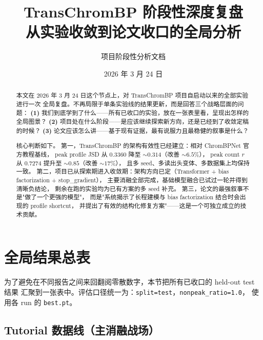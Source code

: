 \documentclass[11pt,a4paper]{ctexart}
\title{TransChromBP 阶段性深度复盘\\
\large 从实验收敛到论文收口的全局分析}
\author{项目阶段性分析文档}
\date{2026 年 3 月 24 日}
\begin{document}
\maketitle

\begin{abstract}
本文在 2026 年 3 月 24 日这个节点上，对 TransChromBP 项目自启动以来的全部实验进行一次
全局复盘。不再局限于单条实验线的结果更新，而是回答三个战略层面的问题：
\textbf{(1)} 我们到底学到了什么——所有已收口的实验，放在一张表里看，呈现出怎样的全局图景？
\textbf{(2)} 项目处在什么阶段——是应该继续探索新方向，还是已经到了收敛定稿的时候？
\textbf{(3)} 论文应该怎么讲——基于现有证据，最有说服力且最稳健的叙事是什么？

核心判断如下。
第一，TransChromBP 的架构有效性已经建立：相对 ChromBPNet 官方教程基线，
peak profile JSD 从 $0.3360$ 降至 $\sim 0.314$（改善 $\sim 6.5\%$），
peak count $r$ 从 $0.7274$ 提升至 $\sim 0.85$（改善 $\sim 17\%$），
且多 seed、多读出头变体、多数据集上均保持一致。
第二，项目已从探索期进入收敛期：架构方向已定（Transformer + bias factorization + stop\_gradient），
主要消融全部完成，基础模型融合已试过一轮并得到清晰负结论，
剩余在跑的实验均为已有方案的多 seed 补充。
第三，论文的最强叙事不是"做了一个更强的模型"，
而是"系统揭示了长程建模与 bias factorization 结合时会出现的 profile shortcut，
并提出了有效的结构化修复方案"——这是一个可独立成立的技术贡献。
\end{abstract}

\tableofcontents
\newpage

\section{全局结果总表}
\label{sec:global-table}

为了避免在不同报告之间来回翻阅零散数字，本节把所有已收口的 held-out test 结果
汇聚到一张表中。评估口径统一为：\texttt{split=test}，\texttt{nonpeak\_ratio=1.0}，
使用各 run 的 \texttt{best.pt}。

\subsection{Tutorial 数据线（主消融战场）}
\end{document}
